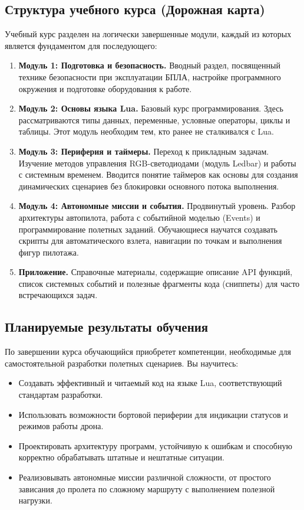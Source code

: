 \subsection*{Структура учебного курса (Дорожная карта)}

Учебный курс разделен на логически завершенные модули, каждый из которых является фундаментом для последующего:

\begin{enumerate}
    \item \textbf{Модуль 1: Подготовка и безопасность.}
    Вводный раздел, посвященный технике безопасности при эксплуатации БПЛА, настройке программного окружения и подготовке оборудования к работе.

    \item \textbf{Модуль 2: Основы языка Lua.}
    Базовый курс программирования. Здесь рассматриваются типы данных, переменные, условные операторы, циклы и таблицы. Этот модуль необходим тем, кто ранее не сталкивался с Lua.

    \item \textbf{Модуль 3: Периферия и таймеры.}
    Переход к прикладным задачам. Изучение методов управления RGB-светодиодами (модуль Ledbar) и работы с системным временем. Вводится понятие таймеров как основы для создания динамических сценариев без блокировки основного потока выполнения.

    \item \textbf{Модуль 4: Автономные миссии и события.}
    Продвинутый уровень. Разбор архитектуры автопилота, работа с событийной моделью (Events) и программирование полетных заданий. Обучающиеся научатся создавать скрипты для автоматического взлета, навигации по точкам и выполнения фигур пилотажа.

    \item \textbf{Приложение.}
    Справочные материалы, содержащие описание API функций, список системных событий и полезные фрагменты кода (сниппеты) для часто встречающихся задач.
\end{enumerate}

\subsection*{Планируемые результаты обучения}

По завершении курса обучающийся приобретет компетенции, необходимые для самостоятельной разработки полетных сценариев. Вы научитесь:
\begin{itemize}
    \item Создавать эффективный и читаемый код на языке Lua, соответствующий стандартам разработки.
    \item Использовать возможности бортовой периферии для индикации статусов и режимов работы дрона.
    \item Проектировать архитектуру программ, устойчивую к ошибкам и способную корректно обрабатывать штатные и нештатные ситуации.
    \item Реализовывать автономные миссии различной сложности, от простого зависания до пролета по сложному маршруту с выполнением полезной нагрузки.
\end{itemize}
